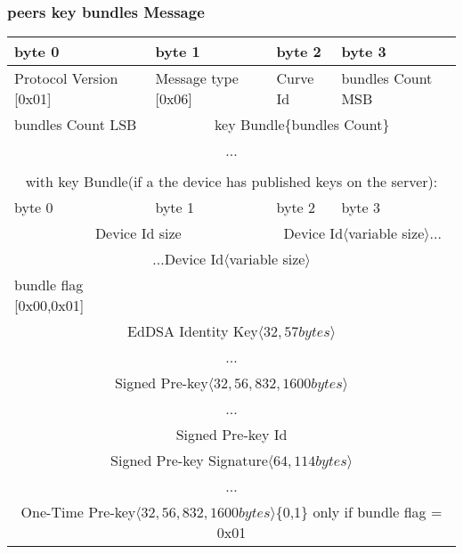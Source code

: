 \documentclass[a4paper,11pt]{article}
\begin{document}
    \subsubsection{peers key bundles Message}
      \begin{center}
      \begin{tabular}{ | p{1.4in} | p{1.4in} | p{1.4in} | p{1.4in} |}
        \hline
        \cellcolor[gray]{0.85} byte 0 & \cellcolor[gray]{0.85} byte 1 & \cellcolor[gray]{0.85} byte 2 & \cellcolor[gray]{0.85}byte 3\\
        \hline
        Protocol Version [0x01] & Message type [0x06] & Curve Id & bundles Count MSB\\
        \hline
        bundles Count LSB & \multicolumn{3}{c|}{key Bundle\{bundles Count\}}\\
        \cline{1-1}
        \multicolumn{4}{|c|}{...}\\
        \hline
        \multicolumn{4}{c}{}\\
        \multicolumn{4}{c}{with key Bundle(if a the device has published keys on the server):}\\
        \hline
        \cellcolor[gray]{0.95} byte 0 & \cellcolor[gray]{0.95} byte 1 & \cellcolor[gray]{0.95} byte 2 & \cellcolor[gray]{0.95}byte 3\\
        \hline
        \multicolumn{2}{|c|}{Device Id size}&\multicolumn{2}{c|}{Device Id$\langle$variable size$\rangle$...}\\
        \hline
        \multicolumn{4}{|c|}{...Device Id$\langle$variable size$\rangle$}\\
        \hline
        bundle flag [0x00,0x01] & \multicolumn{3}{c|}{}\\
        \cline{1-1}
        \multicolumn{4}{|c|}{EdDSA Identity Key$\langle 32,57bytes\rangle $}\\
        \multicolumn{4}{|c|}{...}\\
        \hline
        \multicolumn{4}{|c|}{Signed Pre-key$\langle 32,56,832,1600bytes\rangle $}\\
        \multicolumn{4}{|c|}{...}\\
        \hline
        \multicolumn{4}{|c|}{Signed Pre-key Id}\\
        \hline
        \multicolumn{4}{|c|}{Signed Pre-key Signature$\langle 64,114bytes\rangle $}\\
        \multicolumn{4}{|c|}{...}\\
        \hline
        \multicolumn{4}{|c|}{One-Time Pre-key$\langle 32,56,832,1600bytes\rangle $\{0,1\} only if bundle flag = 0x01}\\

\end{tabular}
\end{center}
\end{document}
